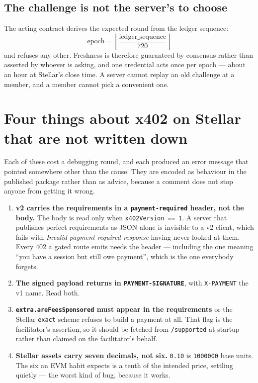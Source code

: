 \documentclass[11pt,a4paper]{article}
\begin{document}
\subsection{The challenge is not the server's to choose}

The acting contract derives the expected round from the ledger sequence:
\[
  \mathrm{epoch} = \left\lfloor \frac{\mathrm{ledger\_sequence}}{720} \right\rfloor
\]
and refuses any other. Freshness is therefore guaranteed by consensus rather
than asserted by whoever is asking, and one credential acts once per epoch ---
about an hour at Stellar's close time. A server cannot replay an old challenge
at a member, and a member cannot pick a convenient one.

\section{Four things about x402 on Stellar that are not written down}

Each of these cost a debugging round, and each produced an error message that
pointed somewhere other than the cause. They are encoded as behaviour in the
published package rather than as advice, because a comment does not stop anyone
from getting it wrong.

\begin{enumerate}
  \item \textbf{v2 carries the requirements in a \texttt{payment-required}
    header, not the body.} The body is read only when
    \texttt{x402Version == 1}. A server that publishes perfect requirements as
    JSON alone is invisible to a v2 client, which fails with
    \emph{Invalid payment required response} having never looked at them. Every
    402 a gated route emits needs the header --- including the one meaning
    ``you have a session but still owe payment'', which is the one everybody
    forgets.
  \item \textbf{The signed payload returns in \texttt{PAYMENT-SIGNATURE}},
    with \texttt{X-PAYMENT} the v1 name. Read both.
  \item \textbf{\texttt{extra.areFeesSponsored} must appear in the
    requirements} or the Stellar \texttt{exact} scheme refuses to build a
    payment at all. That flag is the facilitator's assertion, so it should be
    fetched from \texttt{/supported} at startup rather than claimed on the
    facilitator's behalf.
  \item \textbf{Stellar assets carry seven decimals, not six.} \texttt{0.10} is
    \texttt{1000000} base units. The six an EVM habit expects is a tenth of the
    intended price, settling quietly --- the worst kind of bug, because it
    works.
\end{enumerate}
\end{document}
